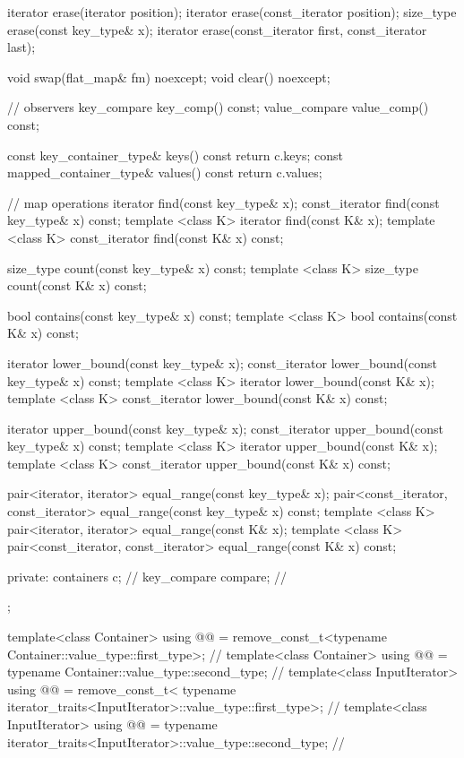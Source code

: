 \begin{codeblock}
\begin{codeblock}
\begin{codeblock}
\begin{addedblock}
\begin{codeblock}
{{      iterator erase(iterator position);
      iterator erase(const_iterator position);
      size_type erase(const key_type& x);
      iterator erase(const_iterator first, const_iterator last);

      void swap(flat_map& fm) noexcept;
      void clear() noexcept;

      // observers
      key_compare key_comp() const;
      value_compare value_comp() const;

      const key_container_type& keys() const      { return c.keys; }
      const mapped_container_type& values() const { return c.values; }

      // map operations
      iterator find(const key_type& x);
      const_iterator find(const key_type& x) const;
      template <class K> iterator find(const K& x);
      template <class K> const_iterator find(const K& x) const;

      size_type count(const key_type& x) const;
      template <class K> size_type count(const K& x) const;

      bool contains(const key_type& x) const;
      template <class K> bool contains(const K& x) const;

      iterator lower_bound(const key_type& x);
      const_iterator lower_bound(const key_type& x) const;
      template <class K> iterator lower_bound(const K& x);
      template <class K> const_iterator lower_bound(const K& x) const;

      iterator upper_bound(const key_type& x);
      const_iterator upper_bound(const key_type& x) const;
      template <class K> iterator upper_bound(const K& x);
      template <class K> const_iterator upper_bound(const K& x) const;

      pair<iterator, iterator> equal_range(const key_type& x);
      pair<const_iterator, const_iterator> equal_range(const key_type& x) const;
      template <class K>
        pair<iterator, iterator> equal_range(const K& x);
      template <class K>
        pair<const_iterator, const_iterator> equal_range(const K& x) const;

  private:
    containers c;        // \expos
    key_compare compare; // \expos
  };

  template<class Container>
    using @@ =
      remove_const_t<typename Container::value_type::first_type>;         // \expos
  template<class Container>
    using @@ =
      typename Container::value_type::second_type;                        // \expos
  template<class InputIterator>
    using @@ = remove_const_t<
      typename iterator_traits<InputIterator>::value_type::first_type>;   // \expos
  template<class InputIterator>
    using @@ =
      typename iterator_traits<InputIterator>::value_type::second_type;   // \expos

}
\end{codeblock}
\end{addedblock}
\end{codeblock}
\end{codeblock}
\end{codeblock}

